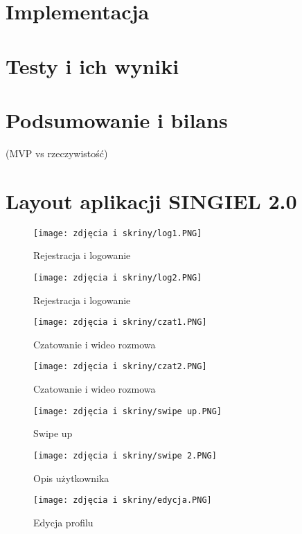 \documentclass[12pt,a4paper]{article}
\begin{document}
\section{Implementacja}
\section{Testy i ich wyniki}
\section{Podsumowanie i bilans}
(MVP vs rzeczywistość)





\newpage


\section{Layout aplikacji SINGIEL 2.0}
\begin{figure}[H]
\centering
\texttt{[image: zdjęcia i skriny/log1.PNG]}
\caption{Rejestracja i logowanie}
\end{figure}

\begin{figure}[H]
\centering
\texttt{[image: zdjęcia i skriny/log2.PNG]}
\caption{Rejestracja i logowanie}
\end{figure}


\begin{figure}[H]
\centering
\texttt{[image: zdjęcia i skriny/czat1.PNG]}
\caption{Czatowanie i wideo rozmowa}
\end{figure}

\begin{figure}[H]
\centering
\texttt{[image: zdjęcia i skriny/czat2.PNG]}
\caption{Czatowanie i wideo rozmowa}
\end{figure}

\begin{figure}[H]
\centering
\texttt{[image: zdjęcia i skriny/swipe up.PNG]}
\caption{Swipe up}
\end{figure}

\begin{figure}[H]
\centering
\texttt{[image: zdjęcia i skriny/swipe 2.PNG]}
\caption{Opis użytkownika}
\end{figure}


\begin{figure}[H]
\centering
\texttt{[image: zdjęcia i skriny/edycja.PNG]}
\caption{Edycja profilu}
\end{figure}
\end{document}
